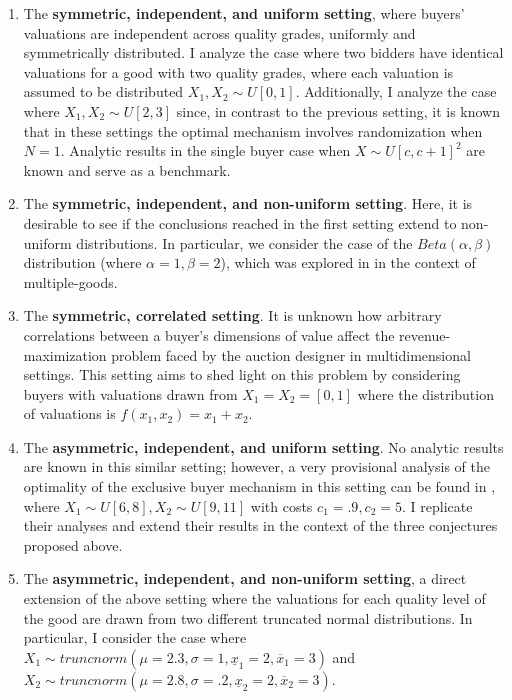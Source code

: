 \begin{enumerate}
    \item The \textbf{symmetric, independent, and uniform setting}, where buyers' valuations are independent across quality grades, uniformly and symmetrically distributed. I analyze the case where two bidders have identical valuations for a good with two quality grades, where each valuation is assumed to be distributed $X_1,X_2 \sim U[0,1]$. Additionally, I analyze the case where $X_1,X_2 \sim U[2,3]$ since, in contrast to the previous setting, it is known that in these settings the optimal mechanism involves randomization when $N=1$. Analytic results in the single buyer case when $X \sim U[c,c+1]^2$ are known \autocite{pavlov2011optimal} and serve as a benchmark.

    \item The \textbf{symmetric, independent, and non-uniform setting}. Here, it is desirable to see if the conclusions reached in the first setting extend to non-uniform distributions. In particular, we consider the case of the $Beta(\alpha,\beta)$ distribution (where $\alpha=1,\beta=2$), which was explored in \autocite{daskalakis2017strong} in the context of multiple-goods.  

    \item The \textbf{symmetric, correlated setting}. It is unknown how arbitrary correlations between a buyer's dimensions of value affect the revenue-maximization problem faced by the auction designer in multidimensional settings. This setting aims to shed light on this problem by considering buyers with valuations drawn from $X_1 = X_2 = [0,1]$ where the distribution of valuations is $f(x_1,x_2) = x_1 + x_2$.

    \item The \textbf{asymmetric, independent, and uniform setting}. No analytic results are known in this similar setting; however, a very provisional analysis of the optimality of the exclusive buyer mechanism in this setting can be found in \autocite{belloni2010multidimensional}, where $X_1 \sim U[6,8], X_2 \sim U[9,11]$ with costs $c_1 = .9, c_2 = 5$. I replicate their analyses and extend their results in the context of the three conjectures proposed above.

    \item The \textbf{asymmetric, independent, and non-uniform setting}, a direct extension of the above setting where the valuations for each quality level of the good are drawn from two different truncated normal distributions. In particular, I consider the case where $X_1 \sim truncnorm(\mu=2.3, \sigma=1, \underline{x}_1=2, \overline{x}_1=3)$ and $X_2 \sim truncnorm(\mu=2.8, \sigma=.2, \underline{x}_2=2, \overline{x}_2=3)$.
\end{enumerate}




